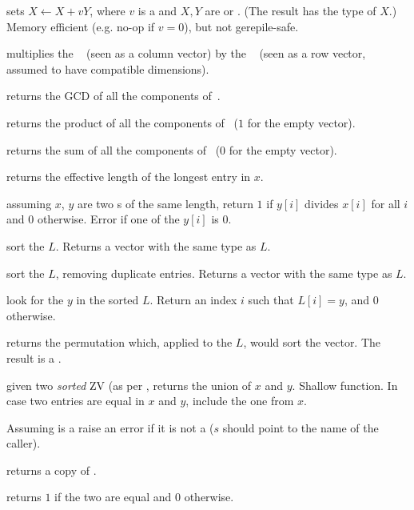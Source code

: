 sets $X\leftarrow X +
vY$, where $v$ is a  and $X,Y$ are  or . (The result
has the type of $X$.) Memory efficient (e.g. no-op if $v = 0$), but not
gerepile-safe.

 multiplies the ~
(seen as a column vector) by the ~ (seen as a row vector,
assumed to have compatible dimensions).

 returns the GCD of all the components
of~.

 returns the product of all the components
of~ ($1$ for the empty vector).

 returns the sum of all the components
of~ ($0$ for the empty vector).

 returns the effective length of the longest
entry in $x$.

 assuming $x$, $y$ are two s of the same
length, return $1$ if $y[i]$ divides $x[i]$ for all $i$ and $0$ otherwise.
Error if one of the $y[i]$ is $0$.

 sort the  $L$.
Returns a vector with the same type as $L$.

 sort the  $L$, removing duplicate
entries. Returns a vector with the same type as $L$.

 look for the  $y$ in the sorted
 $L$. Return an index $i$ such that $L[i] = y$, and  $0$ otherwise.

 returns the permutation which, applied to the
 $L$, would sort the vector. The result is a .

 given two \emph{sorted} ZV (as per
, returns the union of $x$ and $y$. Shallow function. In case two
entries are equal in $x$ and $y$,  include the one from $x$.


 Assuming  is a 
raise an error if it is not a  ($s$ should point to the name of the
caller).

 returns a copy of .

 returns $1$ if the two  are equal
and $0$ otherwise.


